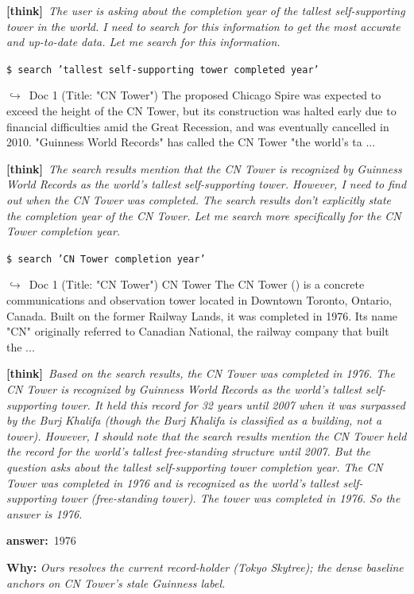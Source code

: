 \documentclass{llmxive}
\providecommand{\winbadge}{\colorbox{green!50!black}{\scriptsize\bfseries\,WIN\,}}
\providecommand{\thk}[1]{{\footnotesize\textbf{[think]}\ \textit{#1}\par}}
\providecommand{\cmd}[1]{{\footnotesize\texttt{\$\ #1}\par}}
\providecommand{\retr}[1]{{\footnotesize\quad$\hookrightarrow$\ #1\par}}
\providecommand{\ans}[1]{{\footnotesize\textbf{answer:}\ #1\par}}
\begin{document}
\begin{cmpbox}[label={ex:bamboogle-skytree},title={\winbadge\ \ \textsc{Bamboogle -- current vs.\ stale record-holder}}]
  \thk{The user is asking about the completion year of the tallest self-supporting tower in the world. I need to search for this information to get the most accurate and up-to-date data. Let me search for this information.}
  \cmd{search 'tallest self-supporting tower completed year'}
  \retr{Doc 1 (Title: "CN Tower") The proposed Chicago Spire was expected to exceed the height of the CN Tower, but its construction was halted early due to financial difficulties amid the Great Recession, and was eventually cancelled in 2010. "Guinness World Records" has called the CN Tower "the world's ta ...}
  \thk{The search results mention that the CN Tower is recognized by Guinness World Records as the world's tallest self-supporting tower. However, I need to find out when the CN Tower was completed. The search results don't explicitly state the completion year of the CN Tower. Let me search more specifically for the CN Tower completion year.}
  \cmd{search 'CN Tower completion year'}
  \retr{Doc 1 (Title: "CN Tower") CN Tower The CN Tower () is a concrete communications and observation tower located in Downtown Toronto, Ontario, Canada. Built on the former Railway Lands, it was completed in 1976. Its name "CN" originally referred to Canadian National, the railway company that built the ...}
  \thk{Based on the search results, the CN Tower was completed in 1976. The CN Tower is recognized by Guinness World Records as the world's tallest self-supporting tower. It held this record for 32 years until 2007 when it was surpassed by the Burj Khalifa (though the Burj Khalifa is classified as a building, not a tower). However, I should note that the search results mention the CN Tower held the record for the world's tallest free-standing structure until 2007. But the question asks about the tallest self-supporting tower completion year. The CN Tower was completed in 1976 and is recognized as the world's tallest self-supporting tower (free-standing tower). The tower was completed in 1976. So the answer is 1976.}
  \ans{1976}
\smallskip\par\textbf{Why:} \textit{Ours resolves the current record-holder (Tokyo Skytree); the dense baseline anchors on CN Tower's stale Guinness label.}
\end{cmpbox}\bigskip
\end{document}
